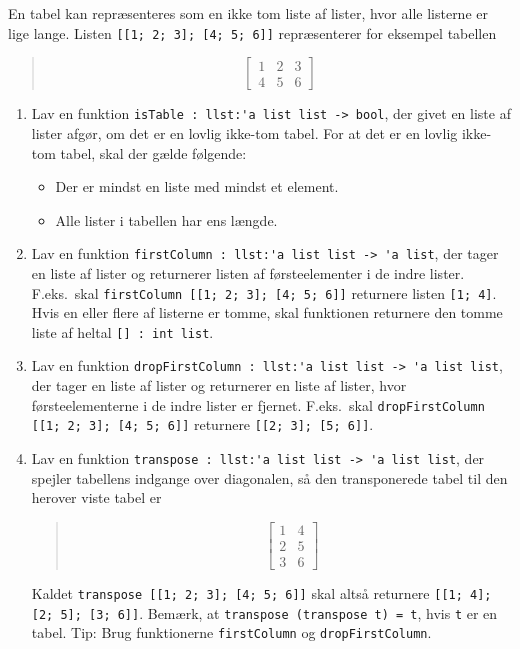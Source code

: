 En tabel kan repræsenteres som en ikke tom liste af lister, hvor alle listerne er lige lange. Listen \lstinline{[[1; 2; 3]; [4; 5; 6]]} repræsenterer for eksempel tabellen
  \begin{quote}
\[\left [\begin{array}{rrr}
1 & 2 & 3 \\
4 & 5 & 6
\end{array}
\right ]\]
\end{quote}
\begin{enumerate}
\item Lav en funktion \lstinline{isTable : llst:'a list list -> bool},
  der givet en liste af lister afgør, om det er en lovlig ikke-tom
  tabel. For at det er en lovlig ikke-tom tabel, skal der gælde følgende:
  \begin{itemize}
  \item Der er mindst en liste med mindst et element.
  \item Alle lister i tabellen har ens længde.
  \end{itemize}
\item Lav en funktion \lstinline{firstColumn : llst:'a list list -> 'a list}, der tager en liste af lister og returnerer listen af førsteelementer i de indre lister.  F.eks.\ skal \lstinline{firstColumn [[1; 2; 3]; [4; 5; 6]]} returnere listen \lstinline{[1; 4]}.  Hvis en eller flere af listerne er tomme, skal funktionen returnere den tomme liste af heltal \lstinline{[] : int list}.
\item Lav en funktion \lstinline{dropFirstColumn : llst:'a list list -> 'a list list}, der tager en liste af lister og returnerer en liste af lister, hvor førsteelementerne i de indre lister er fjernet.  F.eks.\ skal \lstinline{dropFirstColumn [[1; 2; 3]; [4; 5; 6]]} returnere \lstinline{[[2; 3]; [5; 6]]}.
\item Lav en funktion \lstinline{transpose : llst:'a list list -> 'a list list}, der spejler tabellens indgange over diagonalen, så den transponerede tabel til den herover viste tabel er
  \begin{quote}
\[\left [\begin{array}{rr}
1 & 4 \\
2 & 5 \\
3 & 6
\end{array}
\right ]\]
\end{quote}
Kaldet \lstinline{transpose [[1; 2; 3]; [4; 5; 6]]} skal altså
returnere \lstinline{[[1; 4]; [2; 5]; [3; 6]]}.
Bemærk, at \lstinline{transpose (transpose t) = t}, hvis \lstinline{t} er en tabel.  Tip: Brug funktionerne \lstinline{firstColumn} og \lstinline{dropFirstColumn}.
\end{enumerate}
